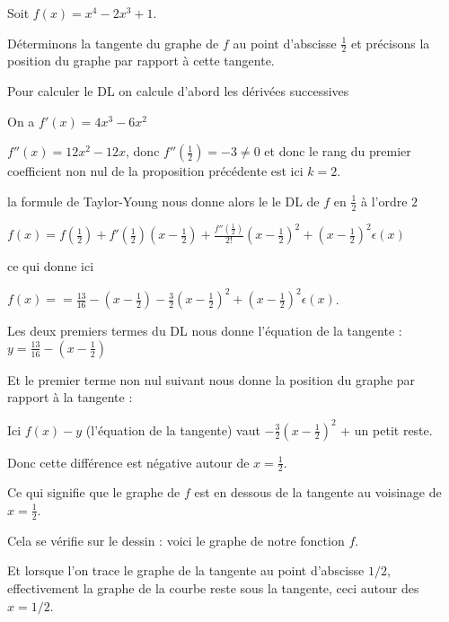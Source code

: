 \diapo


Soit $f(x)=x^4-2x^3+1$.

Déterminons la tangente du graphe de $f$ au point d'abscisse $\frac{1}{2}$  
et précisons la position du graphe par rapport à cette tangente.

\change

Pour calculer le DL on calcule d'abord les dérivées successives 

On a $f'(x)=4x^3-6x^2$

\change

$f''(x)=12x^2-12x$, donc $f''(\frac{1}{2}) = -3 \neq 0$ et donc le rang du premier coefficient non nul 
de la proposition précédente est ici $k=2$.

\change

la formule de Taylor-Young nous donne alors le le DL de $f$ en $\frac{1}{2}$ à l'ordre $2$

\change

$f(x)=f(\frac12)+f'(\frac12)(x-\frac12)+\frac{f''(\frac12)}{2!}(x-\frac12)^2 +(x-\frac12)^2 \epsilon(x)$

\change

ce qui donne ici 

$f(x)==\frac{13}{16} -(x- \frac12) -\frac{3}{2}(x-\frac12)^2 + (x-\frac12)^2 \epsilon(x)$.

\change

Les deux premiers termes du DL nous donne l'équation de la tangente :
$y= \frac{13}{16} -(x- \frac12)$

\change

Et le premier terme non nul suivant nous donne la position du graphe par rapport à la tangente :

Ici $f(x)-y$ (l'équation de la tangente) vaut $-\frac32(x-\frac12)^2$ + un petit reste.

Donc cette différence est négative autour de $x=\frac12$. 

\change

Ce qui signifie que le graphe de $f$ est en dessous de la tangente au voisinage de $x=\frac12$.

\diapo

Cela se vérifie sur le dessin :
voici le graphe de notre fonction $f$.

\change

Et lorsque l'on trace le graphe de la tangente au point d'abscisse $1/2$,
effectivement la graphe de la courbe reste sous la tangente,
ceci autour des $x=1/2$.


